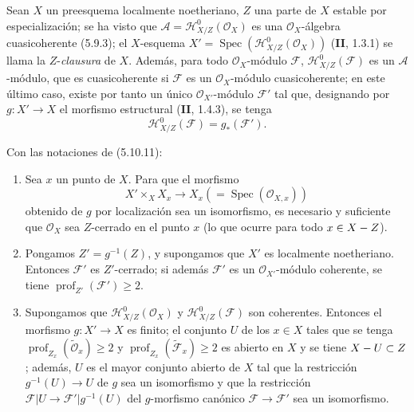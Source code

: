 \begin{env}[5.10.11]
\label{IV.2.s5.10.11-fr}
Sean $X$ un preesquema localmente noetheriano, $Z$ una parte de $X$ estable
por especialización; se ha visto que
$\mathcal A=\mathcal H^0_{X/Z}(\mathcal O_X)$ es una
$\mathcal O_X$-álgebra cuasicoherente (5.9.3); el $X$-esquema
$X'=\operatorname{Spec}(\mathcal H^0_{X/Z}(\mathcal O_X))$ (\textbf{II}, 1.3.1) se
llama la $Z$-\emph{clausura} de $X$. Además, para todo $\mathcal O_X$-módulo
$\mathcal F$, $\mathcal H^0_{X/Z}(\mathcal F)$ es un $\mathcal A$-módulo,
que es cuasicoherente si $\mathcal F$ es un $\mathcal O_X$-módulo
cuasicoherente; en este último caso, existe por tanto un único
$\mathcal O_{X'}$-módulo $\mathcal F'$ tal que, designando por
$g:X'\to X$ el morfismo estructural (\textbf{II}, 1.4.3), se tenga
\begin{equation}
\mathcal H^0_{X/Z}(\mathcal F)=g_*(\mathcal F').
\tag{5.10.11.1}\label{IV.2.s5.10.11.1-fr}
\end{equation}
\end{env}

\begin{proposition}[5.10.12]
\label{IV.2.s5.10.12-fr}
Con las notaciones de \textup{(5.10.11)}:
\begin{enumerate}
\item[\textup{(i)}] Sea $x$ un punto de $X$. Para que el morfismo
\[
X'\times_X X_x\longrightarrow X_x(=\operatorname{Spec}(\mathcal O_{X,x}))
\]
obtenido de $g$ por localización sea un isomorfismo, es necesario y suficiente
que $\mathcal O_X$ sea $Z$-cerrado en el punto $x$ (lo que ocurre para todo
$x\in X- Z$).
\item[\textup{(ii)}] Pongamos $Z'=g^{-1}(Z)$, y supongamos que $X'$ es localmente
noetheriano. Entonces $\mathcal F'$ es $Z'$-cerrado; si además $\mathcal F'$ es
un $\mathcal O_{X'}$-módulo coherente, se tiene
$\operatorname{prof}_{Z'}(\mathcal F')\geq2$.
\item[\textup{(iii)}] Supongamos que $\mathcal H^0_{X/Z}(\mathcal O_X)$ y
$\mathcal H^0_{X/Z}(\mathcal F)$ son coherentes. Entonces el morfismo
$g:X'\to X$ es finito; el conjunto $U$ de los $x\in X$ tales que se tenga
$\operatorname{prof}_{Z_x}(\widetilde{\mathcal O}_x)\geq2$ y
$\operatorname{prof}_{Z_x}(\widetilde{\mathcal F}_x)\geq2$ es abierto en
$X$ y se tiene $X- U\subset Z$; además, $U$ es el mayor conjunto abierto de $X$
tal que la restricción $g^{-1}(U)\to U$ de $g$ sea un isomorfismo y que la
restricción $\mathcal F|U\to\mathcal F'|g^{-1}(U)$ del $g$-morfismo canónico
$\mathcal F\to\mathcal F'$ sea un isomorfismo.
\end{enumerate}
\end{proposition}

